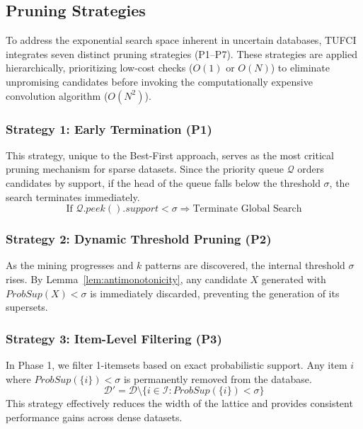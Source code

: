 \documentclass[10pt,letterpaper]{article}
\begin{document}
\subsection*{Pruning Strategies}
\label{subsec:pruning}

To address the exponential search space inherent in uncertain databases, TUFCI integrates seven distinct pruning strategies (P1–P7). These strategies are applied hierarchically, prioritizing low-cost checks ($O(1)$ or $O(N)$) to eliminate unpromising candidates before invoking the computationally expensive convolution algorithm ($O(N^2)$).

\subsubsection*{Strategy 1: Early Termination (P1)}
This strategy, unique to the Best-First approach, serves as the most critical pruning mechanism for sparse datasets. Since the priority queue $\mathcal{Q}$ orders candidates by support, if the head of the queue falls below the threshold $\sigma$, the search terminates immediately.
\begin{equation}
\text{If } \mathcal{Q}.\mathit{peek}().support < \sigma \Rightarrow \text{Terminate Global Search}
\end{equation}

\subsubsection*{Strategy 2: Dynamic Threshold Pruning (P2)}
As the mining progresses and $k$ patterns are discovered, the internal threshold $\sigma$ rises. By Lemma~\ref{lem:antimonotonicity}, any candidate $X$ generated with $\mathit{ProbSup}(X) < \sigma$ is immediately discarded, preventing the generation of its supersets.

\subsubsection*{Strategy 3: Item-Level Filtering (P3)}
In Phase 1, we filter 1-itemsets based on exact probabilistic support. Any item $i$ where $\mathit{ProbSup}(\{i\}) < \sigma$ is permanently removed from the database.
\begin{equation}
\mathcal{D}' = \mathcal{D} \setminus \{i \in \mathcal{I} : \mathit{ProbSup}(\{i\}) < \sigma\}
\end{equation}
This strategy effectively reduces the width of the lattice and provides consistent performance gains across dense datasets.
\end{document}
